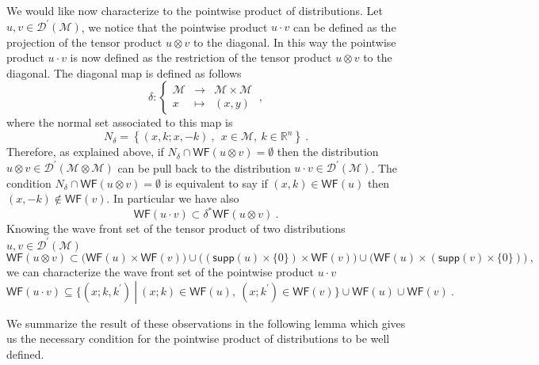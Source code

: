 \documentclass[11pt]{book}
\newcommand{\supp}{\mathsf{supp}}
\newcommand{\WF}{\mathsf{WF}}
\newcommand{\Dcal}{\mathcal{D}}
\newcommand{\Mcal}{\mathcal{M}}
\newcommand{\Rbb}{\mathbb{R}}
\theoremstyle{break}
\begin{document}
We would like now characterize to the pointwise product of distributions. Let $u,v \in \Dcal^\prime(\Mcal)$, we notice that the pointwise product $u \cdot v$ can be defined as the projection of the tensor product $u \otimes v$ to the diagonal. In this way the pointwise product $u \cdot v$ is now defined as the restriction of the tensor product $u \otimes v$ to the diagonal. The diagonal map is defined as follows
%
\begin{equation}
\delta : \left\{
\begin{array}{ccc}
\Mcal & \to & \Mcal \times \Mcal \\
x & \mapsto & (x,y)  
\end{array}
\right. \ ,
\label{eq:diag_map}
\end{equation}
%
where the normal set associated to this map is 
%
\begin{equation*}
N_\delta = \left\{ (x,k;x,-k) \ , \ \ x \in \Mcal , \ k \in \Rbb^n \right\} \ .
\end{equation*}
%
Therefore, as explained above, if $N_\delta \cap \WF(u \otimes v) = \emptyset$ then the distribution $u \otimes v \in \Dcal^\prime(\Mcal \otimes \Mcal)$ can be pull back to the distribution $u \cdot v \in \Dcal^\prime(\Mcal)$. The condition $N_\delta \cap \WF(u \otimes v) = \emptyset$ is equivalent to say if $(x,k) \in \WF(u)$ then $(x,-k) \notin \WF(v)$. In particular we have also 
%
\begin{equation*}
\WF(u \cdot v) \subset \delta^\ast \WF(u \otimes v) \ .
\end{equation*}
%
Knowing the wave front set of the tensor product of two distributions $u, v \in\Dcal^\prime(\Mcal)$ 
%
\begin{equation*}
\WF(u \otimes v) \subset 
\bigg( \WF(u) \times \WF(v) \bigg) 
\cup 
\bigg( \left(\supp(u) \times \{0\} \right) \times \WF(v) \bigg) 
\cup 
\bigg( \WF(u) \times \left( \supp(v) \times \{0\} \right) \bigg) \ ,
\end{equation*}
%
we can characterize the wave front set of the pointwise product $u \cdot v$
%
\begin{equation*}
\WF(u \cdot v) \subseteq \bigg\{ (x;k,k^\prime) \ \left\vert \ (x;k) \in \WF(u) , \ (x;k^\prime) \in \WF(v) \bigg\} \right. \cup \WF(u) \cup \WF(v) \ . 
\end{equation*} 


We summarize the result of these observations in the following lemma which gives us the necessary condition for the pointwise product of distributions to be well defined. 
\end{document}

